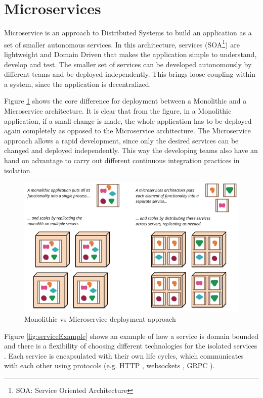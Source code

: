 \newpage
\section{Microservices}

Microservice is an approach to Distributed Systems to build an application
as a set of smaller autonomous services. In this architecture, services (SOA\footnote{SOA: Service Oriented Architecture}) \cite[chapter ~3]{SOA}
are lightweight and Domain Driven \cite{DDD} that makes the application simple to understand, develop and test. The smaller set of services
can be developed autonomously by different teams and be deployed independently. This brings loose coupling within a system, 
since the application is decentralized.

Figure \ref{fig:monolithVsMicro} shows the core difference for deployment between a Monolithic and a Microservice architecture. 
It is clear that from the figure, in a Monolithic application, if a small change is made, the whole application has to be deployed again completely as 
opposed to the Microservice architecture. The Microservice approach allows a rapid development, since only the desired services
can be changed and deployed independently. This way the developing teams also have an hand on advantage to carry out different
continuous integration practices in isolation.


\begin{figure}[htbp!]
    \centering \includegraphics[scale=0.6]{grafiken/monolithVsMicro.png}
    \caption{ Monolithic vs Microservice deployment approach \cite{FowlerMartin}}
    \label{fig:monolithVsMicro}
\end{figure}

\newpage
Figure \ref{fig:serviceExample} shows an example of how 
a service is domain bounded and there is a flexibility of choosing different
technologies for the isolated services \cite{MicroserviceNewMan}. 
Each service is encapsulated with their own life cycles, which communicates with each other using protocols 
(e.g. HTTP \cite{HTTP}, websockets \cite{WebSockets}, GRPC \cite{grpc}). 

